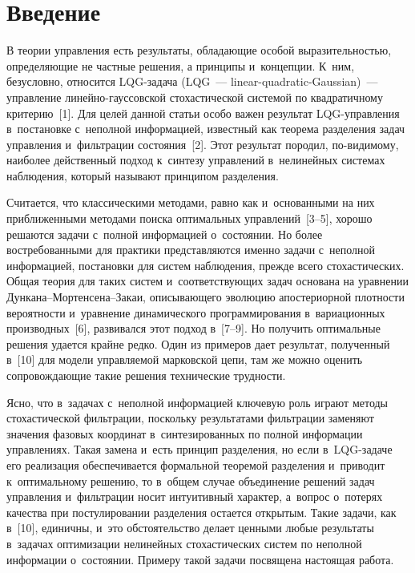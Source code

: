 \begin{multicols}{2}

\label{st\stat}


\section{Введение}

     В теории управления есть результаты, обладающие особой 
выразительностью, определяющие не частные решения, а принципы 
и~концепции. К~ним, безусловно, относится LQG-за\-да\-ча
(LQG~--- linear-quadratic-Gaussian)~--- управление  
ли\-ней\-но-гаус\-сов\-ской стохастической сис\-те\-мой по квадратичному 
критерию~[1]. Для целей данной статьи особо важен результат  
LQG-управ\-ле\-ния в~постановке с~неполной информацией, известный как 
теорема разделения задач управления и~фильт\-ра\-ции со\-сто\-яния~[2]. Этот 
результат породил, по-ви\-ди\-мо\-му, наиболее действенный подход 
к~синтезу управлений в~нелинейных системах наблюдения, который 
называют принципом разделения.
     
     Считается, что классическими методами, равно как и~основанными на 
них приближенными методами поиска оптимальных управлений~[3--5], 
хорошо решаются задачи с~полной информацией о~со\-сто\-янии. Но более 
востребованными для практики представляются именно задачи с~неполной 
информацией, постановки для систем наблюдения, прежде всего 
стохастических. Общая теория для таких систем и~соответствующих задач 
основана на уравнении Дун\-ка\-на--Мор\-тен\-се\-на--За\-каи, описывающего 
эволюцию апостериорной плот\-ности вероятности и~уравнение 
динамического программирования в~вариационных производных~[6], 
развивался этот подход в~[7--9]. Но получить оптимальные решения удается 
крайне редко. Один из примеров дает результат, полученный в~[10] для 
модели управляемой марковской цепи, там же можно оценить 
сопровождающие такие решения технические трудности.
     
     Ясно, что в~задачах с~неполной информацией ключевую роль играют 
методы стохастической фильтрации, поскольку результатами фильтрации 
заменяют значения фазовых координат в~синтезированных по полной 
информации управлениях. Такая замена и~есть принцип разделения, но если 
в~LQG-за\-да\-че его реализация обеспечивается формальной теоремой 
разделения и~приводит к~оптимальному решению, то в~общем случае 
объединение решений задач управления и~фильтрации носит интуитивный 
характер, а~вопрос о~потерях качества при постулировании разделения 
остается открытым. Такие задачи, как в~[10], единичны, и~это обстоятельство 
делает ценными любые результаты в~задачах оптимизации нелинейных 
стохастических систем по неполной информации о~со\-сто\-янии. Примеру 
такой задачи посвящена настоящая ра\-бота.


\end{multicols}
